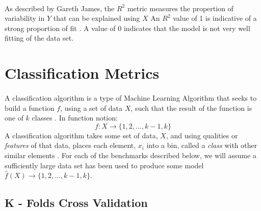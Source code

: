 \documentclass[12pt,letterpaper]{article}
\begin{document}
\paragraph*{}As described by Gareth James, the $R^2$ metric measures the propertion of variability in $Y$ that can be explained using $X$ \cite{James} An $R^2$ value of 1 is indicative of a strong proportion of fit \cite{Petrik}. A value of $0$ indicates that the model is not very well fitting of the data set.



\section{Classification Metrics}
\paragraph*{}A classification algorithm is a type of Machine Learning Algorithm that seeks to build a function $f$, using a set of data $X$, such that the result of the function is one of $k$ classes \cite{Petrik}. In function notion:
\begin{equation}
\label{classification function}
f: X \rightarrow \{1,2,...,k-1,k\}
\end{equation}
A classification algorithm takes some set of data, $X$, and using qualities or \textit{features} of that data, places each element, $x_i$ into a bin, called a \textit{class} with other similar elements \cite{Geron}. For each of the benchmarks described below, we will assume a sufficiently large data set has been used to produce some model $\hat{f}(X) \rightarrow \{1,2,...,k-1,k\}$.


\subsection{K - Folds Cross Validation}
\end{document}
